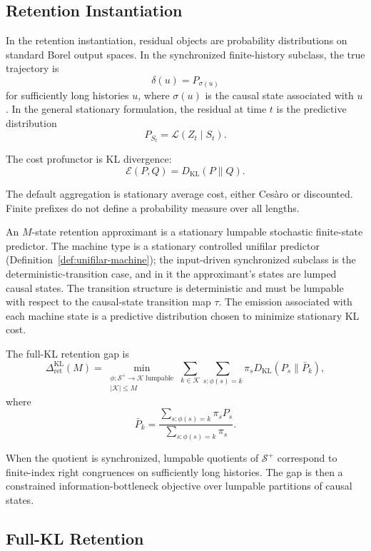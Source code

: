 \documentclass[12pt]{article}
\theoremstyle{definition}
\newcommand{\RetKL}{\Delta_{\mathrm{ret}}^{\mathrm{KL}}}
\newcommand{\Splus}{\mathcal S^{+}}
\begin{document}
\subsection{Retention Instantiation}
\label{subsec:retention-instantiation}

In the retention instantiation, residual objects are probability distributions
on standard Borel output spaces.  In the synchronized finite-history subclass,
the true trajectory is
\[
\delta(u)=P_{\sigma(u)}
\]
for sufficiently long histories $u$, where $\sigma(u)$ is the causal state
associated with $u$.  In the general stationary formulation, the residual at
time $t$ is the predictive distribution
\[
P_{S_t}
=
\mathcal L(Z_t\mid S_t).
\]

The cost profunctor is KL divergence:
\[
\mathcal E(P,Q)=D_{\mathrm{KL}}(P\|Q).
\]

The default aggregation is stationary average cost, either Ces\`aro or
discounted.  Finite prefixes do not define a probability measure over all
lengths.

An $M$-state retention approximant is a stationary lumpable stochastic
finite-state predictor.  The machine type is a stationary controlled unifilar
predictor (Definition~\ref{def:unifilar-machine}); the input-driven
synchronized subclass is the deterministic-transition case, and in it the
approximant's states are lumped causal states.  The transition structure is deterministic and must be lumpable
with respect to the causal-state transition map $\tau$.  The emission
associated with each machine state is a predictive distribution chosen to
minimize stationary KL cost.

The full-KL retention gap is
\[
\RetKL(M)
=
\min_{\substack{
\phi:\Splus\to\mathcal K\ \text{lumpable}\\
|\mathcal K|\le M
}}
\sum_{k\in\mathcal K}
\sum_{s:\phi(s)=k}
\pi_s
D_{\mathrm{KL}}(P_s\|\bar P_k),
\]
where
\[
\bar P_k
=
\frac{
\sum_{s:\phi(s)=k}\pi_s P_s
}{
\sum_{s:\phi(s)=k}\pi_s
}.
\]

When the quotient is synchronized, lumpable quotients of $\Splus$ correspond
to finite-index right congruences on sufficiently long histories.  The gap is
then a constrained information-bottleneck objective over lumpable partitions
of causal states.

\subsection{Full-KL Retention}
\label{subsec:full-kl-retention}
\end{document}
